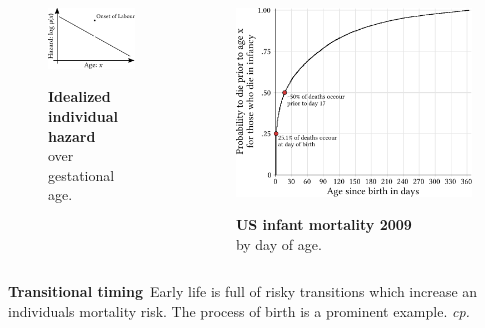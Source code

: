 \documentclass{beamer}
\begin{document}
\begin{frame}
\frametitle{\insertsection}

\begin{columns}[c]

\begin{figure}[htb!]
\caption{\textbf{Idealized individual hazard}\\over gestational age.}
\includegraphics[width = \textwidth]{./fig/birth_trauma.pdf}\\
\end{figure}

\begin{figure}[htb!]
\caption{\textbf{US infant mortality 2009}\\by day of age.}
\includegraphics[width = \textwidth]{./fig/us_imort_2009_cumdx.pdf}\\
\end{figure}

\end{columns}

\vfill

\footnotesize\textbf{Transitional timing}~Early life is full of risky transitions which increase an individuals mortality risk. The process of birth is a prominent example. \scriptsize\emph{cp.~\textcite{Levitis2011}}

\end{frame}
\end{document}
